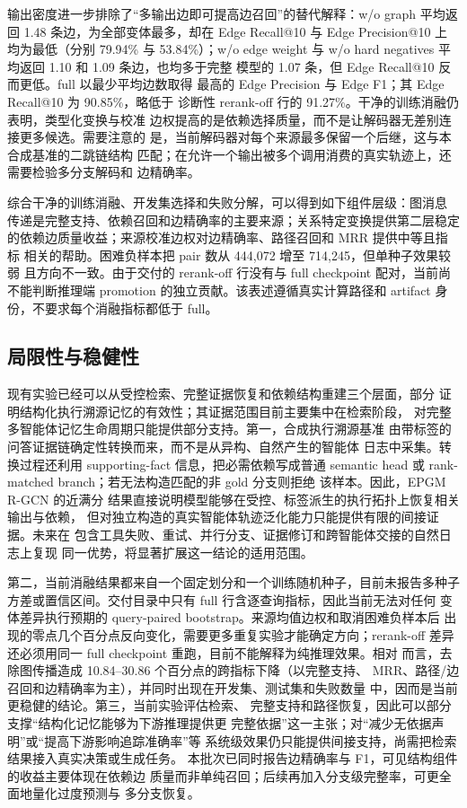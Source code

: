 输出密度进一步排除了“多输出边即可提高边召回”的替代解释：w/o graph
平均返回 1.48 条边，为全部变体最多，却在 Edge Recall@10 与 Edge
Precision@10 上均为最低（分别 79.94\% 与 53.84\%）；w/o edge weight
与 w/o hard negatives 平均返回 1.10 和 1.09 条边，也均多于完整
模型的 1.07 条，但 Edge Recall@10 反而更低。full 以最少平均边数取得
最高的 Edge Precision 与 Edge F1；其 Edge Recall@10 为 90.85\%，略低于
诊断性 rerank-off 行的 91.27\%。干净的训练消融仍表明，类型化变换与校准
边权提高的是依赖选择质量，而不是让解码器无差别连接更多候选。需要注意的
是，当前解码器对每个来源最多保留一个后继，这与本合成基准的二跳链结构
匹配；在允许一个输出被多个调用消费的真实轨迹上，还需要检验多分支解码和
边精确率。

综合干净的训练消融、开发集选择和失败分解，可以得到如下组件层级：图消息
传递是完整支持、依赖召回和边精确率的主要来源；关系特定变换提供第二层稳定
的依赖边质量收益；来源校准边权对边精确率、路径召回和 MRR 提供中等且指标
相关的帮助。困难负样本把 pair 数从 444,072 增至 714,245，但单种子效果较弱
且方向不一致。由于交付的 rerank-off 行没有与 full checkpoint 配对，当前尚
不能判断推理端 promotion 的独立贡献。该表述遵循真实计算路径和 artifact
身份，不要求每个消融指标都低于 full。

\subsection{局限性与稳健性}
\label{subsec:limitations}

现有实验已经可以从受控检索、完整证据恢复和依赖结构重建三个层面，部分
证明结构化执行溯源记忆的有效性；其证据范围目前主要集中在检索阶段，
对完整多智能体记忆生命周期只能提供部分支持。第一，合成执行溯源基准
由带标签的问答证据链确定性转换而来，而不是从异构、自然产生的智能体
日志中采集。转换过程还利用 supporting-fact 信息，把必需依赖写成普通
semantic head 或 rank-matched branch；若无法构造匹配的非 gold 分支则拒绝
该样本。因此，EPGM R-GCN 的近满分
结果直接说明模型能够在受控、标签派生的执行拓扑上恢复相关输出与依赖，
但对独立构造的真实智能体轨迹泛化能力只能提供有限的间接证据。未来在
包含工具失败、重试、并行分支、证据修订和跨智能体交接的自然日志上复现
同一优势，将显著扩展这一结论的适用范围。

第二，当前消融结果都来自一个固定划分和一个训练随机种子，目前未报告多种子
方差或置信区间。交付目录中只有 full 行含逐查询指标，因此当前无法对任何
变体差异执行预期的 query-paired bootstrap。来源均值边权和取消困难负样本后
出现的零点几个百分点反向变化，需要更多重复实验才能确定方向；rerank-off
差异还必须用同一 full checkpoint 重跑，目前不能解释为纯推理效果。相对
而言，去除图传播造成 10.84--30.86 个百分点的跨指标下降（以完整支持、
MRR、路径/边召回和边精确率为主），并同时出现在开发集、测试集和失败数量
中，因而是当前更稳健的结论。第三，当前实验评估检索、
完整支持和路径恢复，因此可以部分支撑“结构化记忆能够为下游推理提供更
完整依据”这一主张；对“减少无依据声明”或“提高下游影响追踪准确率”等
系统级效果仍只能提供间接支持，尚需把检索结果接入真实决策或生成任务。
本批次已同时报告边精确率与 F1，可见结构组件的收益主要体现在依赖边
质量而非单纯召回；后续再加入分支级完整率，可更全面地量化过度预测与
多分支恢复。

